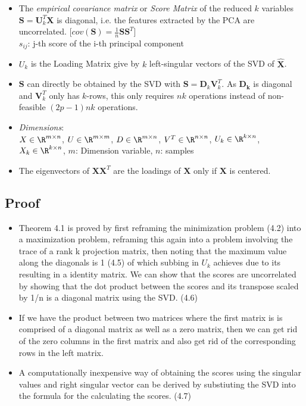\documentclass[english]{latex4ei/latex4ei_sheet}
\begin{document}
\begin{sectionbox}
\begin{itemize}
\item The \emph{empirical covariance matrix} or \emph{Score Matrix} of the reduced $k$ variables $\boldsymbol{S}=\boldsymbol{U}_k^T\boldsymbol{X}$ is diagonal, i.e. the features extracted by the PCA are uncorrelated.       \hspace{20} [$cov(\boldsymbol{S})=\frac{1}{n}\boldsymbol{S}\boldsymbol{S}^T$]\\
$s_{ij}$: j-th score of the i-th principal component
\item $U_k$ is the Loading Matrix give by $k$ left-singular vectors of the SVD of $\boldsymbol{\hat{X}}$.
\item $\boldsymbol{S}$ can directly be obtained by the SVD with $\boldsymbol{S}=\boldsymbol{D}_k\boldsymbol{V}_k^T$. As $\boldsymbol{D_k}$ is diagonal and $\boldsymbol{V}_k^T$ only has $k$-rows, this only requires $nk$ operations instead of non-feasible $(2p-1)nk$ operations.
\item \emph{Dimensions}:\\ $X\in\R^{m\times n}$, $U\in\R^{m\times m}$, $D\in\R^{m\times n}$, $V^T\in\R^{n\times n}$, $U_k\in\R^{k\times n}$, $X_k\in\R^{k\times n}$, $m$: Dimension variable, $n$: samples
\item The eigenvectors of $\mathbf{X}\mathbf{X}^T$ are the loadings of $\mathbf{X}$ only if $\mathbf{X}$ is centered.
\end{itemize}

\subsection{Proof}
\begin{itemize}
\item Theorem 4.1 is proved by first reframing the minimization problem (4.2) into a maximization problem, reframing this again into a problem involving the trace of a rank k projection matrix, then noting that the maximum value along the diagonals is 1 (4.5) of which subbing in $U_k$ achieves due to its resulting in a identity matrix.
We can show that the scores are uncorrelated by showing that the dot product between the scores and its transpose scaled by 1/n is a diagonal matrix using the SVD. (4.6)
\item If we have the product between two matrices where the first matrix is is comprised of a diagonal matrix as well as a zero matrix, then we can get rid of the zero columns in the first matrix and also get rid of the corresponding rows in the left matrix.
\item A computationally inexpensive way of obtaining the scores using the singular values and right singular vector can be derived by substiuting the SVD into the formula for the calculating the scores. (4.7)
\end{itemize}


\end{sectionbox}
\end{document}
